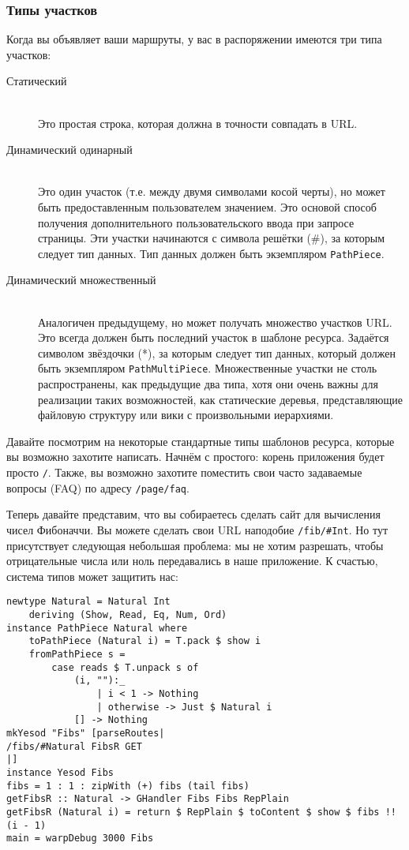 \subsubsection{Типы участков}
Когда вы объявляет ваши маршруты, у вас в распоряжении имеются три
типа участков:
\begin{description}
\item[Статический] \hfill \\
Это простая строка, которая должна в точности совпадать в URL.

\item[Динамический одинарный] \hfill \\
Это один участок (т.е. между двумя символами косой черты), но может
быть предоставленным пользователем значением. Это основой способ
получения дополнительного пользовательского ввода при запросе
страницы. Эти участки начинаются с символа решётки (\#), за которым
следует тип данных. Тип данных должен быть экземпляром
\lstinline!PathPiece!.

\item [Динамический множественный] \hfill \\
Аналогичен предыдущему, но может получать множество участков URL. Это
всегда должен быть последний участок в шаблоне ресурса. Задаётся
символом звёздочки (*), за которым следует тип данных, который должен
быть экземпляром \lstinline!PathMultiPiece!. Множественные участки не
столь распространены, как предыдущие два типа, хотя они очень важны
для реализации таких возможностей, как статические деревья,
представляющие файловую структуру или вики с произвольными иерархиями.
\end{description}

Давайте посмотрим на некоторые стандартные типы шаблонов ресурса,
которые вы возможно захотите написать. Начнём с простого: корень
приложения будет просто \lstinline!/!. Также, вы возможно захотите
поместить свои часто задаваемые вопросы (FAQ) по адресу
\lstinline!/page/faq!.

Теперь давайте представим, что вы собираетесь сделать сайт для
вычисления чисел Фибоначчи. Вы можете сделать свои URL наподобие
\lstinline!/fib/#Int!. Но тут присутствует следующая небольшая проблема: мы не
хотим разрешать, чтобы отрицательные числа или ноль передавались в
наше приложение. К счастью, система типов может защитить нас:
\begin{lstlisting}
newtype Natural = Natural Int
    deriving (Show, Read, Eq, Num, Ord)
instance PathPiece Natural where
    toPathPiece (Natural i) = T.pack $ show i
    fromPathPiece s =
        case reads $ T.unpack s of
            (i, ""):_
                | i < 1 -> Nothing
                | otherwise -> Just $ Natural i
            [] -> Nothing
mkYesod "Fibs" [parseRoutes|
/fibs/#Natural FibsR GET
|]
instance Yesod Fibs
fibs = 1 : 1 : zipWith (+) fibs (tail fibs)
getFibsR :: Natural -> GHandler Fibs Fibs RepPlain
getFibsR (Natural i) = return $ RepPlain $ toContent $ show $ fibs !! (i - 1)
main = warpDebug 3000 Fibs
\end{lstlisting}%

